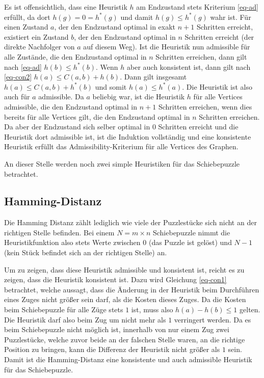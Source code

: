 \documentclass{whswinvcbook}
\begin{document}
Es ist offensichtlich, dass eine Heuristik $h$ am Endzustand stets Kriterium \ref{eq-ad} erfüllt, da dort $h(g)=0=h^*(g)$ und damit $h(g)\leq h^*(g)$ wahr ist. Für einen Zustand $a$, der den Endzustand optimal in exakt $n+1$ Schritten erreicht, existiert ein Zustand $b$, der den Endzustand optimal in $n$ Schritten erreicht (der direkte Nachfolger von $a$ auf diesem Weg). Ist die Heuristik nun admissible für alle Zustände, die den Endzustand optimal in $n$ Schritten erreichen, dann gilt nach \ref{eq-ad} $h(b)\leq h^*(b)$. Wenn $h$ aber auch konsistent ist, dann gilt nach \ref{eq-con2} $h(a)\leq C(a,b)+h(b)$. Dann gilt insgesamt $h(a)\leq C(a,b)+h^*(b)$ und somit $h(a)\leq h^*(a)$. Die Heuristik ist also auch für $a$ admissible. Da $a$ beliebig war, ist die Heuristik $h$ für alle Vertices admissible, die den Endzustand optimal in $n+1$ Schritten erreichen, wenn dies bereits für alle Vertices gilt, die den Endzustand optimal in $n$ Schritten erreichen. Da aber der Endzustand sich selber optimal in $0$ Schritten erreicht und die Heuristik dort admissible ist, ist die Induktion vollständig und eine konsistente Heuristik erfüllt das Admissibility-Kriterium für alle Vertices des Graphen.

An dieser Stelle werden noch zwei simple Heuristiken für das Schiebepuzzle betrachtet.
\subsection{Hamming-Distanz}
Die Hamming Distanz zählt lediglich wie viele der Puzzlestücke sich nicht an der richtigen Stelle befinden. Bei einem $N=m\times n$ Schiebepuzzle nimmt die Heuristikfunktion also stets Werte zwischen $0$ (das Puzzle ist gelöst) und $N-1$ (kein Stück befindet sich an der richtigen Stelle) an.

Um zu zeigen, dass diese Heuristik admissible und konsistent ist, reicht es zu zeigen, dass die Heuristik konsistent ist. Dazu wird Gleichung \ref{eq-con1} betrachtet, welche aussagt, dass die Änderung in der Heuristik beim Durchführen eines Zuges nicht größer sein darf, als die Kosten dieses Zuges. Da die Kosten beim Schiebepuzzle für alle Züge stets $1$ ist, muss also $h(a)-h(b)\leq1$ gelten. Die Heuristik darf also beim Zug um nicht mehr als $1$ verringert werden. Da es beim Schiebepuzzle nicht möglich ist, innerhalb von nur einem Zug zwei Puzzlestücke, welche zuvor beide an der falschen Stelle waren, an die richtige Position zu bringen, kann die Differenz der Heuristik nicht größer als $1$ sein. Damit ist die Hamming-Distanz eine konsistente und auch admissible Heuristik für das Schiebepuzzle.
\end{document}
